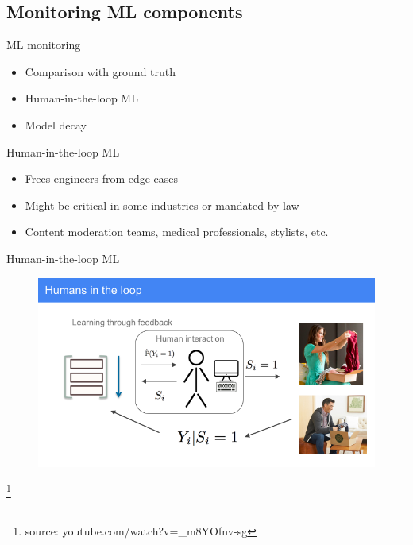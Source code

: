 \documentclass{beamer}
\newcommand\blfootnote[1]{%
  \begingroup
  \renewcommand\thefootnote{}\footnote{\tiny  #1 }%
  \addtocounter{footnote}{-1}%
  \endgroup
}
\begin{document}
\subsection{Monitoring ML components}

\begin{frame}{ML monitoring}
	\begin{itemize}
		\item{Comparison with ground truth}
  		\item{Human-in-the-loop ML}
  		\item{Model decay}
	\end{itemize}
\end{frame}


\begin{frame}{Human-in-the-loop ML}
	\begin{itemize}
		\item{Frees engineers from edge cases} %
		\item{Might be critical in some industries or mandated by law}
		\item{Content moderation teams, medical professionals, stylists, etc.}
	\end{itemize}
\end{frame}


\begin{frame}{Human-in-the-loop ML}
	\begin{figure}
		\centering
		\includegraphics[width=0.8\linewidth]{stitchfix_flow.png}
	\end{figure}
	\blfootnote{source: youtube.com/watch?v=\_m8YOfnv-sg}
\end{frame}
\end{document}
